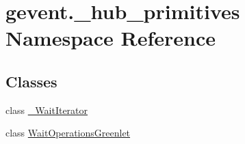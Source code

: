 \hypertarget{namespacegevent_1_1__hub__primitives}{}\section{gevent.\+\_\+hub\+\_\+primitives Namespace Reference}
\label{namespacegevent_1_1__hub__primitives}
\subsection*{Classes}
\begin{DoxyCompactItemize}
\item 
class \hyperlink{classgevent_1_1__hub__primitives_1_1___wait_iterator}{\+\_\+\+Wait\+Iterator}
\item 
class \hyperlink{classgevent_1_1__hub__primitives_1_1_wait_operations_greenlet}{Wait\+Operations\+Greenlet}
\end{DoxyCompactItemize}
